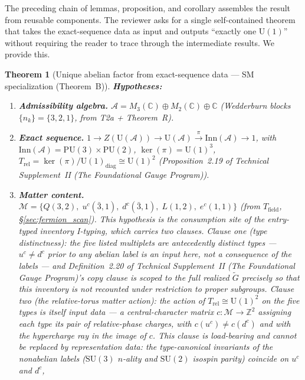 \documentclass[11pt]{article}
\newtheorem{theorem}{Theorem}[section]
\theoremstyle{definition}
\newcommand{\SU}{\mathrm{SU}}
\newcommand{\U}{\mathrm{U}}
\newcommand{\TSII}{Technical Supplement~II (\emph{The Foundational Gauge Program})}
\begin{document}
The preceding chain of lemmas, proposition, and corollary assembles the
result from reusable components.  The reviewer asks for a single
self-contained theorem that takes the exact-sequence data as input and
outputs ``exactly one $\U(1)$'' without requiring the reader to trace
through the intermediate results.  We provide this.

\begin{theorem}[Unique abelian factor from exact-sequence data ---
SM specialization (Theorem~B)]%
\label{thm:unique_U1_consolidated}
\textbf{Hypotheses:}
\begin{enumerate}[label=(H\arabic*),nosep]
  \item \textbf{Admissibility algebra.}\quad
  $\mathcal{A} = M_3(\mathbb{C}) \oplus M_2(\mathbb{C}) \oplus
  \mathbb{C}$ (Wedderburn blocks $\{n_k\} = \{3, 2, 1\}$, from
  T2a + Theorem~R).
  \item \textbf{Exact sequence.}\quad
  $1 \to Z(\mathrm{U}(\mathcal{A})) \to \mathrm{U}(\mathcal{A})
  \xrightarrow{\pi} \mathrm{Inn}(\mathcal{A}) \to 1$, with
  $\mathrm{Inn}(\mathcal{A}) = \mathrm{PU}(3) \times \mathrm{PU}(2)$,
  $\ker(\pi) = \mathrm{U}(1)^3$,
  $T_{\mathrm{rel}} = \ker(\pi) / \mathrm{U}(1)_{\mathrm{diag}}
  \cong \mathrm{U}(1)^2$
  (Proposition~2.19 of \TSII{}).
  \item \textbf{Matter content.}\quad
  $\mathcal{M} = \{Q(3,2),\; u^c(\bar{3},1),\; d^c(\bar{3},1),\;
  L(1,2),\; e^c(1,1)\}$ (from $T_{\mathrm{field}}$,
  \S\ref{sec:fermion_scan}).  This hypothesis is the consumption site
  of the entry-typed inventory I-typing, which carries two clauses.
  \emph{Clause one (type distinctness):} the five listed multiplets
  are \emph{antecedently} distinct types --- $u^c \ne d^c$ prior to
  any abelian label is an input here, not a consequence of the labels
  --- and Definition~2.20 of \TSII{}'s copy clause is
  scoped to the full realized $\widetilde{G}$ precisely so that this
  inventory is not recounted under restriction to proper subgroups.
  \emph{Clause two (the relative-torus matter action):} the action of
  $T_{\mathrm{rel}} \cong \mathrm{U}(1)^2$ on the five types is
  itself input data --- a central-character matrix
  $c : \mathcal{M} \to \mathbb{Z}^2$ assigning each \emph{type} its
  pair of relative-phase charges, with $c(u^c) \neq c(d^c)$ and with
  the hypercharge ray in the image of $c$.  This clause is
  load-bearing and cannot be replaced by representation data: the
  type-canonical invariants of the nonabelian labels ($\SU(3)$
  $n$-ality and $\SU(2)$ isospin parity) coincide on $u^c$ and $d^c$,

\end{enumerate}
\end{theorem}
\end{document}
